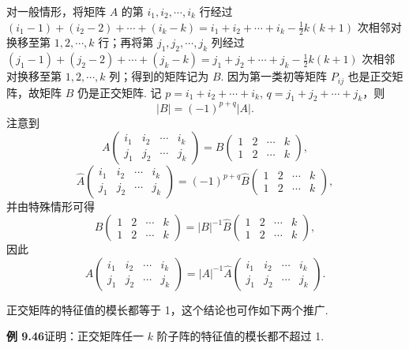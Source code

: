 \documentclass[UTF8, 12pt, fontset=fandol, oneside]{ctexart}
\begin{document}
对一般情形，将矩阵 $A$ 的第 $i_1,i_2,\cdots,i_k$ 行经过 $(i_1-1)+(i_2-2)+\cdots+(i_k-k)=i_1+i_2+\cdots+i_k-\frac12k(k+1)$ 次相邻对换移至第 $1,2,\cdots,k$ 行；再将第 $j_1,j_2,\cdots,j_k$ 列经过 $(j_1-1)+(j_2-2)+\cdots+(j_k-k)=j_1+j_2+\cdots+j_k-\frac12k(k+1)$ 次相邻对换移至第 $1,2,\cdots,k$ 列；得到的矩阵记为 $B$. 因为第一类初等矩阵 $P_{ij}$ 也是正交矩阵，故矩阵 $B$ 仍是正交矩阵. 记 $p=i_1+i_2+\cdots+i_k$, $q=j_1+j_2+\cdots+j_k$，则
\[
|B|=(-1)^{p+q}|A|.
\]
注意到
\[
A\begin{pmatrix}
i_1&i_2&\cdots&i_k\\
j_1&j_2&\cdots&j_k
\end{pmatrix}
=B\begin{pmatrix}
1&2&\cdots&k\\
1&2&\cdots&k
\end{pmatrix},
\]
\[
\widehat{A}\begin{pmatrix}
i_1&i_2&\cdots&i_k\\
j_1&j_2&\cdots&j_k
\end{pmatrix}
=(-1)^{p+q}\widehat{B}\begin{pmatrix}
1&2&\cdots&k\\
1&2&\cdots&k
\end{pmatrix},
\]
并由特殊情形可得
\[
B\begin{pmatrix}
1&2&\cdots&k\\
1&2&\cdots&k
\end{pmatrix}
=|B|^{-1}\widehat{B}\begin{pmatrix}
1&2&\cdots&k\\
1&2&\cdots&k
\end{pmatrix},
\]
因此
\[
A\begin{pmatrix}
i_1&i_2&\cdots&i_k\\
j_1&j_2&\cdots&j_k
\end{pmatrix}
=|A|^{-1}\widehat{A}\begin{pmatrix}
i_1&i_2&\cdots&i_k\\
j_1&j_2&\cdots&j_k
\end{pmatrix}.
\]

正交矩阵的特征值的模长都等于 1，这个结论也可作如下两个推广.

\noindent\textbf{例 9.46}\quad 证明：正交矩阵任一 $k$ 阶子阵的特征值的模长都不超过 1.
\end{document}

